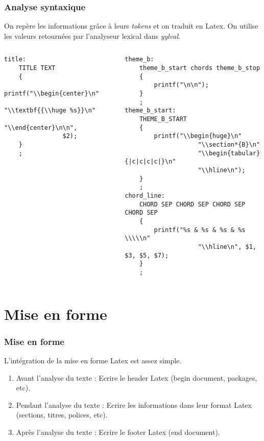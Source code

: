 \documentclass{beamer}
\begin{document}
\begin{frame}[fragile]
\frametitle{Analyse syntaxique}
On repère les informations grâce à leurs \textit{tokens} et on traduit en Latex. On utilise les valeurs retournées par l'analyseur lexical dans \textit{yylval}.

\begin{columns}
\column{1.5in}
\begin{tiny}
\begin{verbatim}
title:
	TITLE TEXT
	{
		printf("\\begin{center}\n"
				"\\textbf{{\\huge %s}}\n"
				"\\end{center}\n\n",
				$2);
	}
	;
\end{verbatim}
\end{tiny}

\column{1.5in}
\begin{tiny}
\begin{verbatim}
theme_b:
	theme_b_start chords theme_b_stop
	{
		printf("\n\n");
	}
	;
theme_b_start:
	THEME_B_START
	{
		printf("\\begin{huge}\n"
					"\\section*{B}\n"
					"\\begin{tabular}{|c|c|c|c|}\n"
		    		"\\hline\n");
	}
	;
chord_line:
	CHORD SEP CHORD SEP CHORD SEP CHORD SEP
	{
		printf("%s & %s & %s & %s \\\\\n"
					"\\hline\n", $1, $3, $5, $7);
	}
	;
\end{verbatim}
\end{tiny}

\end{columns}
\end{frame}

\section{Mise en forme}
\begin{frame}
\frametitle{Mise en forme}
L'intégration de la mise en forme Latex est assez simple.
\begin{enumerate}
\item Avant l'analyse du texte : Ecrire le header Latex {\small (begin document, packages, etc)}.
\item Pendant l'analyse du texte : Ecrire les informations dans leur format Latex {\small (sections, titres, polices, etc)}.
\item Après l'analyse du texte : Ecrire le footer Latex {\small (end document)}. 
\end{enumerate}
\end{frame}
\end{document}
